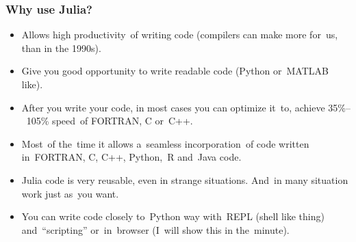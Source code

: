 \documentclass[10pt,t]{beamer}
\begin{document}
\begin{frame}
  \frametitle{Why use Julia?}


  \begin{itemize}

  \item Allows high productivity~of writing code (compilers can make
    more for~us, than in the 1990s).

  \item Give you good opportunity to write readable code (Python
    or~MATLAB like).

  \item After you write your code, in \alert{most cases} you can
    optimize it~to, achieve 35\%--~105\% speed~of FORTRAN, C or~C++.

  \item Most~of the~time it allows a~seamless incorporation~of code
    written in~FORTRAN, C, C++, Python,~R and~Java code.

  \item Julia code is very reusable, even in strange situations.
    And~in many situation work just as~you want.

  \item You can write code closely to~Python way with~REPL (shell like
    thing) and~``scripting'' or~in~browser (I~will \alert{show} this
    in the~minute).


  \end{itemize}

\end{frame}
\end{document}

